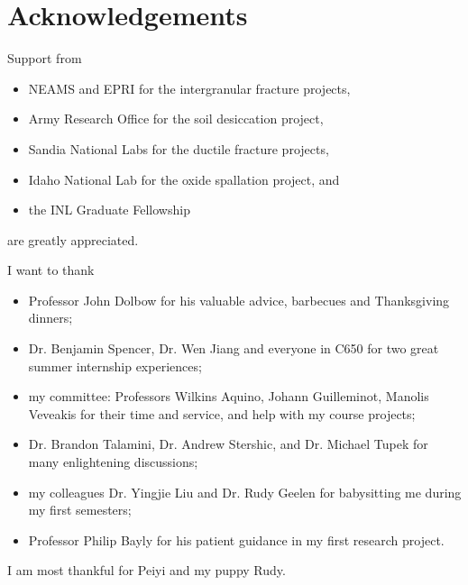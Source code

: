 \section{Acknowledgements}

\begin{frame}[noframenumbering]
  \vspace{-1.5em}
  
  Support from
  \begin{itemize}
    \item[] NEAMS and EPRI for the intergranular fracture projects,
    \item[] Army Research Office for the soil desiccation project,
    \item[] Sandia National Labs for the ductile fracture projects,
    \item[] Idaho National Lab for the oxide spallation project, and
    \item[] the INL Graduate Fellowship
  \end{itemize}
  are greatly appreciated.
  
  \bigskip
  
  I want to thank
  \begin{itemize}
    \item[] Professor John Dolbow for his valuable advice, barbecues and Thanksgiving dinners;
    \item[] Dr. Benjamin Spencer, Dr. Wen Jiang and everyone in C650 for two great summer internship experiences;
    \item[] my committee: Professors Wilkins Aquino, Johann Guilleminot, Manolis Veveakis for their time and service, and help with my course projects;
    \item[] Dr. Brandon Talamini, Dr. Andrew Stershic, and Dr. Michael Tupek for many enlightening discussions;
    \item[] my colleagues Dr. Yingjie Liu and Dr. Rudy Geelen for babysitting me during my first semesters;
    \item[] Professor Philip Bayly for his patient guidance in my first research project.
  \end{itemize}
  
  \bigskip
  
  I am most thankful for Peiyi and my puppy Rudy.
\end{frame}
